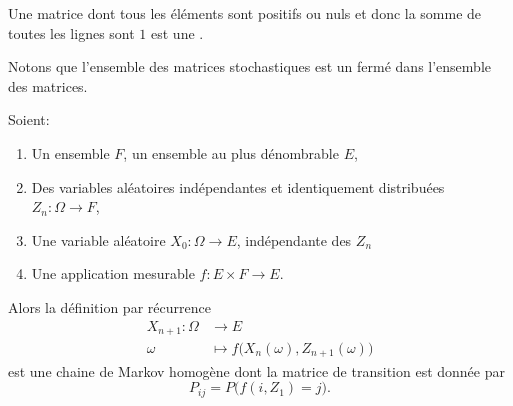 \begin{definition}      \label{DefGJEBooZvuIAV}
	Une matrice dont tous les éléments sont positifs ou nuls et donc la somme de toutes les lignes sont \( 1\) est une .
\end{definition}
Notons que l'ensemble des matrices stochastiques est un fermé dans l'ensemble des matrices.

\begin{proposition}       \label{PROPooBYELooKLsthC}
    Soient:
    \begin{enumerate}
        \item
            Un ensemble \( F\), un ensemble au plus dénombrable \( E\),
        \item
            Des variables aléatoires indépendantes et identiquement distribuées \( Z_n\colon \Omega\to F\),
        \item
            Une variable aléatoire \( X_0\colon \Omega\to E\), indépendante des \( Z_n\)
        \item
            Une application mesurable \( f\colon E\times F \to E\).
    \end{enumerate}
    Alors la définition par récurrence 
    \begin{equation}
        \begin{aligned}
            X_{n+1}\colon \Omega&\to E \\
            \omega&\mapsto f\big( X_n(\omega),Z_{n+1}(\omega) \big) 
        \end{aligned}
    \end{equation}
    est une chaine de Markov homogène dont la matrice de transition est donnée par
    \begin{equation}
        P_{ij}=P\big( f(i,Z_1)=j \big).
    \end{equation}
\end{proposition}

